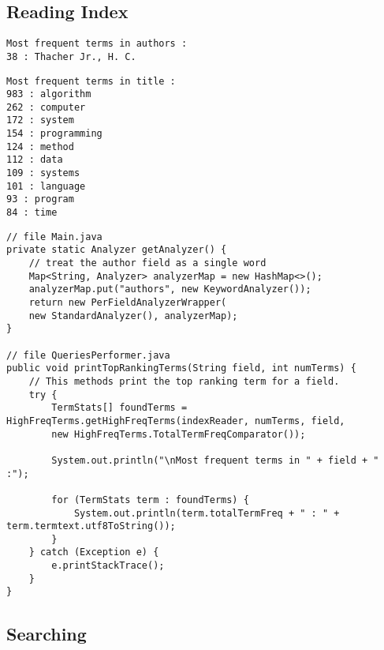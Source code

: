 \documentclass[11pt,a4paper,twoside,svgnames]{article}
\begin{document}
	\subsection{Reading Index}
	\texttt{Most frequent terms in authors :}\\
	\texttt{38 : Thacher Jr., H. C.}

\texttt{Most frequent terms in title :}\\
\texttt{983 : algorithm}\\
\texttt{262 : computer}\\
\texttt{172 : system}\\
\texttt{154 : programming}\\
\texttt{124 : method}\\
\texttt{112 : data}\\
\texttt{109 : systems}\\
\texttt{101 : language}\\
\texttt{93 : program}\\
\texttt{84 : time}
	\begin{lstlisting}
// file Main.java
private static Analyzer getAnalyzer() {	
	// treat the author field as a single word
	Map<String, Analyzer> analyzerMap = new HashMap<>();
	analyzerMap.put("authors", new KeywordAnalyzer());
	return new PerFieldAnalyzerWrapper(
	new StandardAnalyzer(), analyzerMap);
}

// file QueriesPerformer.java
public void printTopRankingTerms(String field, int numTerms) {
	// This methods print the top ranking term for a field.
	try {
		TermStats[] foundTerms = HighFreqTerms.getHighFreqTerms(indexReader, numTerms, field,
		new HighFreqTerms.TotalTermFreqComparator());
		
		System.out.println("\nMost frequent terms in " + field + " :");
		
		for (TermStats term : foundTerms) {
			System.out.println(term.totalTermFreq + " : " + term.termtext.utf8ToString());
		}
	} catch (Exception e) {
		e.printStackTrace();
	}
}
	\end{lstlisting}
	
	\subsection{Searching}
	
\end{document}

